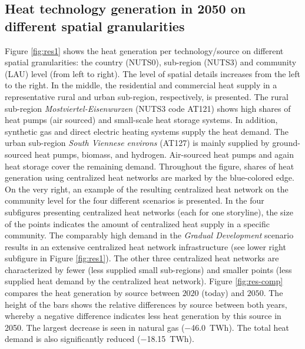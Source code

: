 \subsection{Heat technology generation in 2050 on different spatial granularities}\label{res:2}
Figure \ref{fig:res1} shows the heat generation per technology/source on different spatial granularities: the country (NUTS0), sub-region (NUTS3) and community (LAU) level (from left to right). The level of spatial details increases from the left to the right. In the middle, the residential and commercial heat supply in a representative rural and urban sub-region, respectively, is presented. The rural sub-region \textit{Mostviertel-Eisenwurzen} (NUTS3 code AT121) shows high shares of heat pumps (air sourced) and small-scale heat storage systems. In addition, synthetic gas and direct electric heating systems supply the heat demand. The urban sub-region \textit{South Viennese environs} (AT127) is mainly supplied by ground-sourced heat pumps, biomass, and hydrogen. Air-sourced heat pumps and again heat storage cover the remaining demand. Throughout the figure, shares of heat generation using centralized heat networks are marked by the blue-colored edge. On the very right, an example of the resulting centralized heat network on the community level for the four different scenarios is presented. In the four subfigures presenting centralized heat networks (each for one storyline), the size of the points indicates the amount of centralized heat supply in a specific community. The comparably high demand in the \textit{Gradual Development} scenario results in an extensive centralized heat network infrastructure (see lower right subfigure in Figure \ref{fig:res1}). The other three centralized heat networks are characterized by fewer (less supplied small sub-regions) and smaller points (less supplied heat demand by the centralized heat network). Figure \ref{fig:res-comp} compares the heat generation by source between $2020$ (today) and $2050$. The height of the bars shows the relative differences by source between both years, whereby a negative difference indicates less heat generation by this source in 2050. The largest decrease is seen in natural gas (\SI{-46.0}{TWh}). The total heat demand is also significantly reduced (\SI{-18.15}{TWh}).

